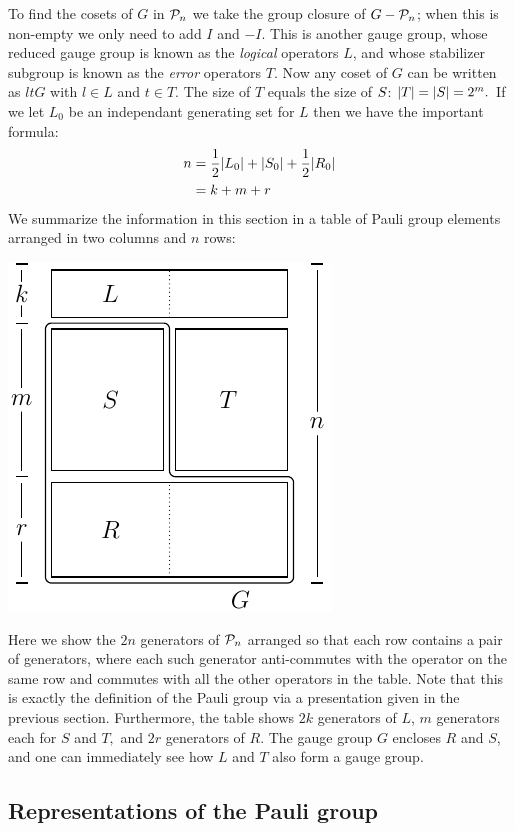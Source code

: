 \documentclass[12pt]{article}
\begin{document}
To find the cosets of $G$ in $\mathcal{P}_n$ we take
the group closure of $G-\mathcal{P}_n$; when this is non-empty
we only need to add $I$ and $-I.$
This is another
gauge group, whose reduced gauge group is known as
the {\it logical} operators $L$, and whose 
stabilizer subgroup is known as the {\it error} operators $T.$
Now any coset of $G$ can be written as $ltG$ with
$l\in L$ and $t\in T.$
The size of $T$ equals the size of $S$: $|T|=|S|=2^m.$
If we let $L_0$ be an independant generating set for $L$
then we have the important formula:
\begin{align}
n &= \frac{1}{2}|L_0| + |S_0| + \frac{1}{2}|R_0|\\
  &= k + m + r
\end{align}
We summarize the information in this section in a table
of Pauli group elements arranged in
two columns and $n$ rows:
\begin{center}
\includegraphics[]{pic-canonical.pdf}
\end{center}
Here we show the $2n$ generators of $\mathcal{P}_n$ arranged 
so that each row contains a pair of generators,
where each such generator anti-commutes with the operator on the same row and
commutes with all the other operators in the table.
Note that this is exactly the definition of the Pauli group
via a presentation given in the previous section.
Furthermore, the table shows $2k$ generators
of $L$, $m$ generators each for $S$ and $T,$ and $2r$
generators of $R.$
The gauge group $G$ encloses $R$ and $S$, and one can
immediately see how $L$ and $T$ also form a gauge group.


\subsection{Representations of the Pauli group}
\end{document}
